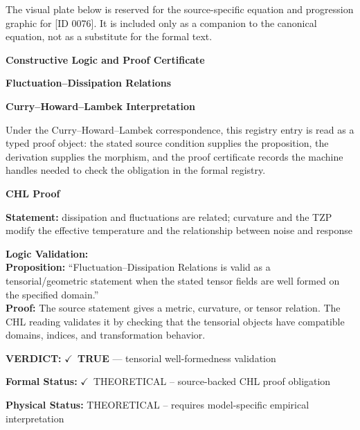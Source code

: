 \begingroup\footnotesize\sloppy
The visual plate below is reserved for the source-specific equation and progression graphic for [ID 0076]. It is included only as a companion to the canonical equation, not as a substitute for the formal text.
\par\endgroup
\ifTZPDarkEdition
{}
\fi

\clearpage
\begingroup\tzpsupportsetup
\noindent\textbf{\fontsize{10.8pt}{12.8pt}\selectfont [ID 0076] Constructive Logic and Proof Certificate}\par
\noindent\textbf{\fontsize{10pt}{12pt}\selectfont Fluctuation--Dissipation Relations}\par
\vspace{0.45em}
\begingroup
\footnotesize
\setlength{\parskip}{0.22em}
\setlength{\parindent}{0pt}
\noindent\textbf{Curry--Howard--Lambek Interpretation}\par
Under the Curry--Howard--Lambek correspondence, this registry entry is read as a typed proof
object: the stated source condition supplies the proposition, the derivation supplies the
morphism, and the proof certificate records the machine handles needed to check the obligation
in the formal registry.

\vspace{0.45em}
\noindent\textbf{CHL Proof}\par
\textbf{Statement:} dissipation and fluctuations are related; curvature and the TZP modify the effective
temperature and the relationship between noise and response

\textbf{Logic Validation:}\\
\textbf{Proposition:} ``Fluctuation--Dissipation Relations is valid as a tensorial/geometric statement when the
stated tensor fields are well formed on the specified domain.''\\
\textbf{Proof:} The source statement gives a metric, curvature, or tensor relation. The CHL reading
validates it by checking that the tensorial objects have compatible domains, indices,
and transformation behavior.

\textbf{VERDICT:} \ensuremath{\checkmark}\ \textbf{TRUE} --- tensorial well-formedness validation

\textbf{Formal Status:} \ensuremath{\checkmark}\ THEORETICAL -- source-backed CHL proof obligation

\textbf{Physical Status:} THEORETICAL -- requires model-specific empirical interpretation
\par\vspace{0.45em}
\par
\ifTZPDarkEdition
{}
\fi
\endgroup
\endgroup
